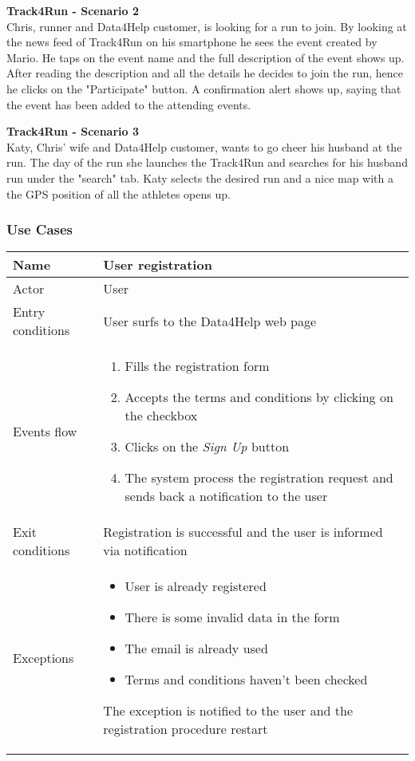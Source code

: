 \textbf{Track4Run - Scenario 2} \\
Chris, runner and Data4Help customer, is looking for a run to join. By looking at the  news feed of Track4Run on his smartphone he sees the event created by Mario. He taps on the event name and the full description of the event shows up. After reading the description and all the details he decides to join the run, hence he clicks on the "Participate" button. A confirmation alert shows up, saying that the event has been added to the attending events.

\textbf{Track4Run - Scenario 3} \\
Katy, Chris' wife and Data4Help customer,  wants to go cheer his husband at the run. The day of the run she launches the Track4Run and searches for his husband run under the "search" tab. Katy selects the desired run and a nice map with a the GPS position of all the athletes opens up.

\newpage

\subsubsection{Use Cases}

\begin{table}[h!]
    \begin{tabular}{|l|p{12cm}|}
        \hline
        Name             & User registration \\ \hline
        Actor            & User \\ \hline
        Entry conditions & User surfs to the Data4Help web page \\ \hline
        Events flow      & 
        \begin{enumerate}
            \item Fills the registration form
            \item Accepts the terms and conditions by clicking on the checkbox 
            \item Clicks on the \textit{Sign Up} button
            \item The system process the registration request and sends back a notification to the user
        \end{enumerate} 
        \\ \hline
        Exit conditions  & Registration is successful and the user is informed via notification \\ \hline
        Exceptions       & 
        \begin{itemize}
            \item User is already registered
            \item There is some invalid data in the form
            \item The email is already used
            \item Terms and conditions haven't been checked
        \end{itemize} The exception is notified to the user and the registration procedure restart \\ \hline
    \end{tabular}
\end{table}

